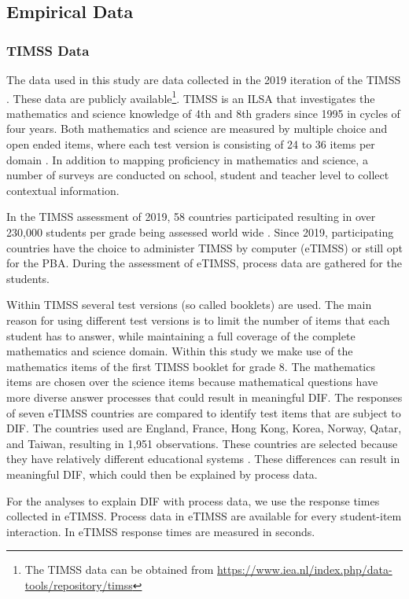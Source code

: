 \documentclass{interact}
\begin{document}
\subsection{Empirical Data}
\subsubsection{TIMSS Data}
The data used in this study are data collected in the 2019 iteration of the TIMSS  \parencite{TIMSS}. These data are publicly available\footnote[1]{The TIMSS data can be obtained from \url{https://www.iea.nl/index.php/data-tools/repository/timss}}. TIMSS is an ILSA that investigates the mathematics and science knowledge of 4th and 8th graders since 1995 in cycles of four years. Both mathematics and science are measured by multiple choice and open ended items, where each test version is consisting of 24 to 36 items per domain \parencite{mullis2017timss}. In addition to mapping proficiency in mathematics and science, a number of surveys are conducted on school, student and teacher level to collect contextual information.

In the TIMSS assessment of 2019, 58 countries participated resulting in over 230,000 students per grade being assessed world wide \parencite{martin2020methods}. Since 2019, participating countries have the choice to administer TIMSS by computer (eTIMSS) or still opt for the PBA. During the assessment of eTIMSS, process data are gathered for the students.

Within TIMSS several test versions (so called booklets) are used. The main reason for using different test versions is to limit the number of items that each student has to answer, while maintaining a full coverage of the complete mathematics and science domain. Within this study we make use of the mathematics items of the first TIMSS booklet for grade 8. The mathematics items are chosen over the science items because mathematical questions have more diverse answer processes that could result in meaningful DIF. The responses of seven eTIMSS countries are compared to identify test items that are subject to DIF. The countries used are England, France, Hong Kong, Korea, Norway, Qatar, and Taiwan, resulting in 1,951 observations. These countries are selected because they have relatively different educational systems \parencite{hofstede1986cultural}. These differences can result in meaningful DIF, which could then be explained by process data.

For the analyses to explain DIF with process data, we use the response times collected in eTIMSS. Process data in eTIMSS are available for every student-item interaction. In eTIMSS response times are measured in seconds. 
\end{document}
